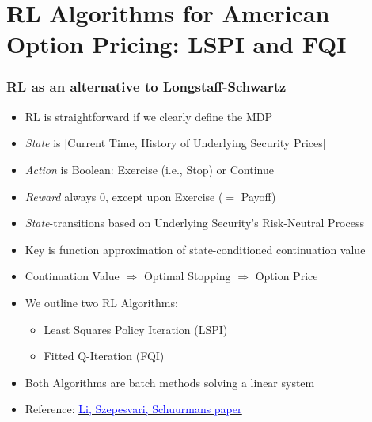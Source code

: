 \documentclass[handout]{beamer}
\begin{document}
\section{RL Algorithms for American Option Pricing: LSPI and FQI}

\begin{frame}
\frametitle{RL as an alternative to Longstaff-Schwartz}
\pause
\begin{itemize}[<+->]
\item RL is straightforward if we clearly define the MDP
\item {\em State} is [Current Time, History of Underlying Security Prices]
\item {\em Action} is Boolean: Exercise (i.e., Stop) or Continue
\item {\em Reward} always 0, except upon Exercise ($=$ Payoff)
\item {\em State}-transitions based on Underlying Security's Risk-Neutral Process
\item Key is function approximation of state-conditioned continuation value
\item Continuation Value $\Rightarrow$ Optimal Stopping $\Rightarrow$ Option Price
\item We outline two RL Algorithms:
\begin{itemize}
\item Least Squares Policy Iteration (LSPI)
\item Fitted Q-Iteration (FQI)
\end{itemize}
\item Both Algorithms are batch methods solving a linear system
\item Reference: \href{http://proceedings.mlr.press/v5/li09d/li09d.pdf}{\underline{\textcolor{blue}{Li, Szepesvari, Schuurmans paper}}}
\end{itemize}
\end{frame}
\end{document}
